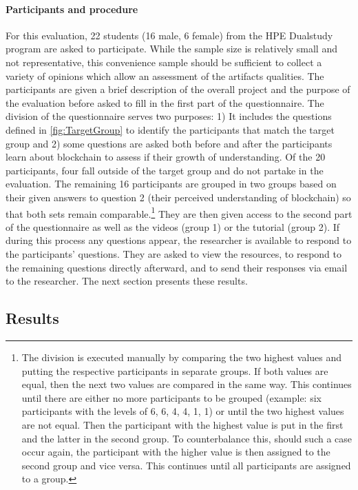 \paragraph{Participants and procedure}
For this evaluation, 22 students (16 male, 6 female) from the HPE Dualstudy program are asked to participate. While the sample size is relatively small and not representative, this convenience sample should be sufficient to collect a variety of opinions which allow an assessment of the artifacts qualities. The participants are given a brief description of the overall project and the purpose of the evaluation before asked to fill in the first part of the questionnaire. The division of the questionnaire serves two purposes: 1) It includes the questions defined in \ref{fig:TargetGroup} to identify the participants that match the target group and 2) some questions are asked both before and after the participants learn about blockchain to assess if their growth of understanding. Of the 20 participants, four fall outside of the target group and do not partake in the evaluation. The remaining 16 participants are grouped in two groups based on their given answers to question 2 (their perceived understanding of blockchain) so that both sets remain comparable.\footnote{The division is executed manually by comparing the two highest values and putting the respective participants in separate groups. If both values are equal, then the next two values are compared in the same way. This continues until there are either no more participants to be grouped (example: six participants with the levels of 6, 6, 4, 4, 1, 1) or until the two highest values are not equal. Then the participant with the highest value is put in the first and the latter in the second group. To counterbalance this, should such a case occur again, the participant with the higher value is then assigned to the second group and vice versa. This continues until all participants are assigned to a group.}
They are then given access to the second part of the questionnaire as well as the videos (group 1) or the tutorial (group 2). If during this process any questions appear, the researcher is available to respond to the participants' questions. They are asked to view the resources, to respond to the remaining questions directly afterward, and to send their responses via email to the researcher. The next section presents these results.

\subsection{Results} \label{subsec:EvaluationResults}

